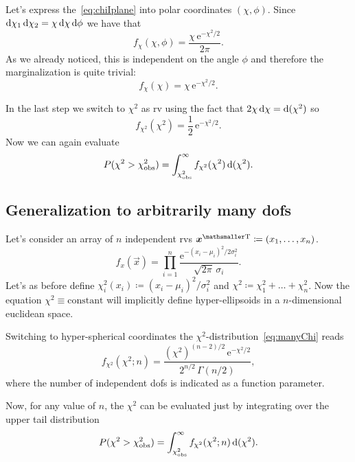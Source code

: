 \documentclass[
	10pt,
	draft
]{scrreprt}
\newcommand{\transpose}[1]{\ensuremath{#1}^{\mathrm{ \mathsmaller T}}}
\newcommand{\eu}{\ensuremath{\mathrm{e}}}
\begin{document}
Let's express the~\eqref{eq:chiIplane} into polar coordinates $(\chi,\phi)$.
Since $\mathop{}\!\mathrm{d}\chi_1\mathop{}\!\mathrm{d}\chi_2 = \chi\mathop{}\!\mathrm{d}\chi\mathop{}\!\mathrm{d}\phi$ we have that
\begin{equation}
f_\chi(\chi,\phi) = \frac{\chi\,\eu^{-\chi^2\!/2}}{2\pi}.
\end{equation}
As we already noticed, this is independent on the angle $\phi$ and therefore the marginalization is quite trivial:
\begin{equation}
f_\chi(\chi) = \chi\,\eu^{-\chi^2\!/2}.
\end{equation}


In the last step we switch to $\chi^2$ as \ac{rv} using the fact that $2\chi\mathop{}\!\mathrm{d}\chi = \mathop{}\!\mathrm{d}(\chi^2)$ so
\begin{equation}
f_{\chi^2}(\chi^2) = \frac{1}{2}\,\eu^{-\chi^2\!/2}.
\end{equation}
Now we can again evaluate
\begin{equation}
P(\chi^2>\chi^2_\textup{obs}) = \int_{\chi^2_\textup{obs}}^\infty f_{\chi^2}(\chi^2)\mathop{}\!\mathrm{d}(\chi^2).
\end{equation}

		\subsection{Generalization to arbitrarily many \acsp{dof}}

Let's consider an array of $n$ independent \acp{rv} $\transpose{\vec{x}}\coloneqq(x_1,\dots,x_n)$.
\begin{equation}\label{eq:manyChi}
f_x(\vec{x}) = \prod_{i=1}^n \frac{\eu^{-(x_i-\mu_i)^2\!/2\sigma_i^2}}{\sqrt{2\pi}\,\sigma_i}.
\end{equation}
Let's as before define $\chi^2_i(x_i) \coloneqq (x_i-\mu_i)^2\!/\sigma_i^2$ and $\chi^2 \coloneqq \chi^2_1+\dots+\chi^2_n$.
Now the equation $\chi^2\equiv\text{constant}$ will implicitly define hyper-ellipsoids in a $n$-dimensional euclidean space.


Switching to hyper-spherical coordinates the $\chi^2$-distribution~\eqref{eq:manyChi} reads
\begin{equation}\label{eq:manyChiSphere}
f_{\chi^2}(\chi^2;n) = \frac{(\chi^2)^{(n-2)/2}\,\eu^{-\chi^2\!/2}}{2^{n/2}\,\Gamma(n/2)},
\end{equation}
where the number of independent \acp{dof} is indicated as a function parameter.


Now, for any value of $n$, the $\chi^2$ can be evaluated just by integrating over the upper tail distribution
\begin{equation}
P(\chi^2>\chi^2_\textup{obs}) = \int_{\chi^2_\textup{obs}}^\infty f_{\chi^2}(\chi^2;n)\mathop{}\!\mathrm{d}(\chi^2).
\end{equation}
\end{document}
